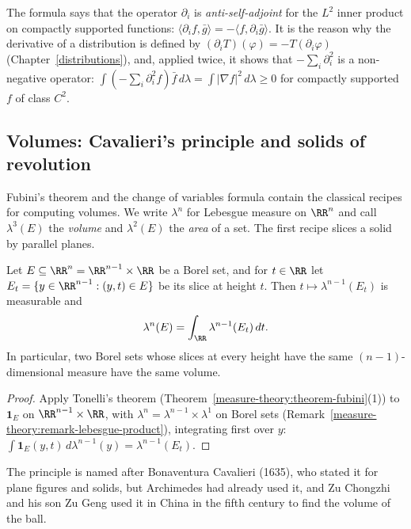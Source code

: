 The formula says that the operator $\partial_i$ is \emph{anti-self-adjoint} for the $L^2$ inner product on compactly supported functions: $\langle\partial_if, \bar g\rangle = -\langle f, \partial_i\bar g\rangle$. It is the
reason why the derivative of a distribution is defined by $(\partial_iT)(\varphi) = -T(\partial_i\varphi)$ (Chapter~\ref{distributions}), and, applied twice, it shows that $-\sum_i\partial_i^2$ is a
non-negative operator: $\int(-\sum_i\partial_i^2f)\bar f\,d\lambda = \int|\nabla f|^2\,d\lambda \geq 0$ for compactly supported $f$ of class $C^2$.

\subsection{Volumes: Cavalieri's principle and solids of revolution}\label{measure-theory:subsection-volumes}

Fubini's theorem and the change of variables formula contain the classical recipes for computing volumes. We write $\lambda^n$ for Lebesgue measure on $\RR^n$ and call $\lambda^3(E)$ the \emph{volume}
and $\lambda^2(E)$ the \emph{area} of a set. The first recipe slices a solid by parallel planes.

\begin{proposition}\label{measure-theory:proposition-cavalieri}
Let $E \subseteq \RR^n = \RR^{n-1} \times \RR$ be a Borel set, and for $t \in \RR$ let $E_t = \{y \in \RR^{n-1} : (y, t) \in E\}$ be its slice at height $t$. Then $t \mapsto \lambda^{n-1}(E_t)$ is measurable and
\[
\lambda^n(E) = \int_\RR\lambda^{n-1}(E_t)\,dt .
\]
In particular, two Borel sets whose slices at every height have the same $(n-1)$-dimensional measure have the same volume.
\end{proposition}

\begin{proof}
Apply Tonelli's theorem (Theorem~\ref{measure-theory:theorem-fubini}(1)) to $\mathbf{1}_E$ on $\RR^{n-1} \times \RR$, with $\lambda^n = \lambda^{n-1} \times \lambda^1$ on Borel sets
(Remark~\ref{measure-theory:remark-lebesgue-product}), integrating first over $y$: $\int\mathbf{1}_E(y, t)\,d\lambda^{n-1}(y) = \lambda^{n-1}(E_t)$.
\end{proof}

The principle is named after Bonaventura Cavalieri (1635), who stated it for plane figures and solids, but Archimedes had already used it, and Zu Chongzhi and his son Zu Geng used it in China in the
fifth century to find the volume of the ball.

